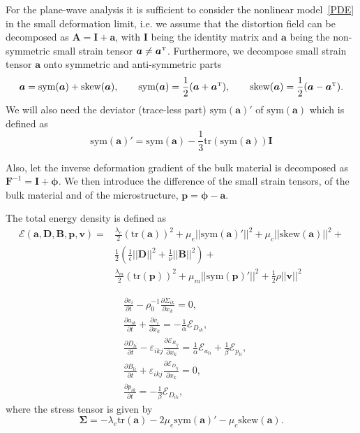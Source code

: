 \documentclass[
10pt, %
a4paper, %
oneside, %
headinclude,footinclude, %
BCOR5mm, %
table,
]{scrartcl}
\newcommand{\Id}{\bm{I}}
\newcommand{\vv}{\bm{v}}
\newcommand{\calE}{\mathcal{E}}						%
\newcommand{\pd}{\partial}
\newcommand{\distsmall}[2]{ a_{{#1}{#2}} }	%
\newcommand{\Dist}{ \bm{A} }	%
\newcommand{\Burg}{ \bm{B} }	%
\newcommand{\Durg}{ \bm{D} }	%
\newcommand{\Distsmall}{ \bm{a} }	%
\newcommand{\Plastsmall}{ \bm{p} }	%
\newcommand{\Defgrad}{ \bm{F} }
\newcommand{\symA}{\text{sym}(\bm{a})}
\newcommand{\skewA}{\text{skew}(\bm{a})}
\newcommand{\symP}{\text{sym}(\bm{p})}
\newcommand{\burg}[1]{ B_{#1} }	%
\newcommand{\veps}{\varepsilon}
\newcommand{\transpose}{{\mathrm {\mathsmaller T}}}
\newcommand{\tr}{\text{tr}}
\begin{document}
For the plane-wave analysis it is sufficient to consider the nonlinear model~\eqref{PDE} in the 
small deformation limit, i.e. we assume that the distortion field can be decomposed as $ \Dist = 
\bm{I} + \Distsmall $, with $ \bm{I} $ being the identity matrix and $ \Distsmall $ being the 
non-symmetric small strain tensor $ \Distsmall \neq \Distsmall^\transpose $. Furthermore, we 
decompose small strain tensor $ \Distsmall $ onto symmetric and anti-symmetric parts
\begin{equation}
	\Distsmall = \symA + \skewA, \qquad 
	\symA = \frac{1}{2}(\Distsmall + \Distsmall^\transpose), \qquad
	\skewA = \frac{1}{2} (\Distsmall - \Distsmall^\transpose).
\end{equation}
We will also need the deviator (trace-less part) $ \symA' $ of $ \symA $ which is defined as
\begin{equation}
\symA' = \symA - \frac{1}{3}\tr(\symA)\bm{I}
\end{equation}

Also, let the inverse deformation gradient of the bulk material is decomposed as $ \Defgrad^{-1} = 
\Id + \bm{\phi}$. We then introduce the difference of the small strain tensors, of the bulk 
material and 
of the microstructure,  $ \Plastsmall = \bm{\phi} - \Distsmall $.

The total energy density is defined as
\begin{align}
\calE(\Distsmall,\Durg,\Burg,\Plastsmall,\vv) = &\frac{\lambda_e}{2}(\tr(\Distsmall))^2 + \mu_e 
||\symA'||^2 + 
\mu_c 
||\skewA||^2 + \nonumber\\
&\frac{1}{2}\left (\frac{1}{\epsilon} ||\Durg||^2+ \frac{1}{\nu}||\Burg||^2\right) + 
\nonumber\\
&\frac{\lambda_m}{2}(\tr(\Plastsmall))^2 + \mu_m 
||\symP'||^2 + \frac{1}{2}\rho ||\vv||^2
\end{align}

\begin{subequations}\label{PDE.lin}
    \begin{align}
        &\frac{\pd v_i}{\pd t} - \rho_0^{-1}\frac{ \pd \Sigma_{ik}}{\pd x_k}   = 
        0,\label{PDE.lin.M}\\[2mm]
        &\frac{\pd \distsmall{i}{k}}{\pd t} + \frac{\pd v_i}{\pd x_k} =         
        -\frac{1}{\alpha}\calE_{D_{ik}},\label{PDE.lin.A}\\[2mm]
        &\frac{\pd D_{li}}{\pd t} - \veps_{i k j} \frac{\pd \calE_{B_{l j}}} {\pd x_k} 
        = \frac{1}{\alpha}\calE_{\distsmall{l}{i}} + 
        \frac{1}{\beta}\calE_{p_{l i}},\label{PDE.lin.D}\\[2mm]
        &\frac{\pd \burg{l i}}{\pd t} +  \veps_{ikj} \frac{\pd\calE_{D_{l j}}}{\pd x_k}  = 
        0,\label{PDE.lin.B}\\[2mm]
        &\frac{\pd p_{ik}}{\pd t} = -\frac{1}{\beta}\calE_{D_{ik}},\label{PDE.lin.p}
    \end{align}
\end{subequations}
where the stress tensor is given by
\begin{equation}
\bm{\Sigma} = -\lambda_e\tr(\Distsmall) - 2 \mu_e \symA' - \mu_c \skewA.
\end{equation}
\end{document}
